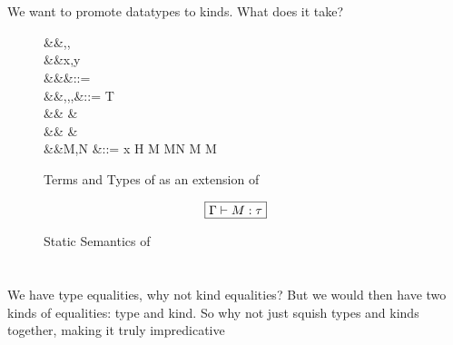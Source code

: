 \documentclass[manuscript,screen,nonacm]{acmart}
\begin{document}
\section{\SFP}\label{sec:sfp} %
We want to promote datatypes to kinds. What does it take?
\begin{figure}[ht]
  \centering
  \begin{syntax}
     &&\alpha,\beta,\gamma \\
     &&x,y          \\
         &&\kappa                  &::= \star \mid \kappa \to \kappa \mid \syntaxhl{\tau \sim \sigma}\\
         &&\tau,\sigma,\gamma,\nu  &::= \alpha \mid T \mid {} \mid \tau \to \tau \mid \Forall {\alpha\co\kappa} \tau\\
    &&                        &\syntaxhl{\mid \sym \Co \mid \comp \nu \Co \mid \Co\At\tau \mid \left \Co \mid \right \Co} \\
    &&                        &\syntaxhl{\mid \leftc \Co \mid \rightc \Co \mid \Cast \Co \Co}\\
         &&M,N                     &::= x \mid H \mid {} M \mid M\App N \mid \TLam{\tau\co\kappa} M \mid M\App \tau
  \end{syntax}
  \caption{Terms and Types of \SFP as an extension of \SFC}
  \label{fig:system-fcp-syntax}
\end{figure}


\begin{figure}[ht]
  \centering
  \begin{gather*}
    \fbox{$\Gamma \vdash M : \tau$}
  \end{gather*}
  \caption{Static Semantics of \SFP}
  \label{fig:sfp-typing}
\end{figure}




\section{\SFK}\label{sec:sfk} %
We have type equalities, why not kind equalities?
But we would then have two kinds of equalities: type and kind.
So why not just squish types and kinds together, making it truly impredicative
\end{document}
